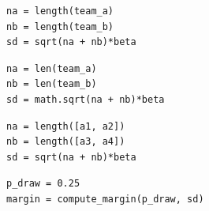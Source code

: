 \documentclass[a4paper,10pt]{book}
\theoremstyle{definition}
\newif\ifen
\newif\ifes
\newcommand{\en}[1]{\ifen#1\fi}
\newcommand{\es}[1]{\ifes#1\fi}
\begin{document}
\begin{lstlisting}[backgroundcolor=\color{white}, label=lst:draw, caption={\en{Computing the draw margin}\es{Computando el margen de empate}}, belowskip=-1.0 \baselineskip, aboveskip=-0 \baselineskip]
\end{lstlisting}
\begin{paracol}{3}
\begin{lstlisting}[backgroundcolor=\color{julia!60},belowskip=-0.77 \baselineskip]
na = length(team_a)
nb = length(team_b)
sd = sqrt(na + nb)*beta
\end{lstlisting}
\switchcolumn
\begin{lstlisting}[backgroundcolor=\color{python!60},belowskip=-0.77 \baselineskip]
na = len(team_a)
nb = len(team_b)
sd = math.sqrt(na + nb)*beta
\end{lstlisting}
\switchcolumn
\begin{lstlisting}[backgroundcolor=\color{r!50},belowskip=-0.77 \baselineskip]
na = length([a1, a2])
nb = length([a3, a4])
sd = sqrt(na + nb)*beta
\end{lstlisting}
\end{paracol}
\begin{lstlisting}[backgroundcolor=\color{all}]
p_draw = 0.25
margin = compute_margin(p_draw, sd)
\end{lstlisting}
%
\en{where the individual agents (\texttt{a1} to \texttt{a4}) were initialized in code~\ref{lst:player} and \texttt{beta} in code~\ref{lst:parameters}. }%
\es{donde los agentes \texttt{a} fueron inicializados en el c\'odigo \ref{lst:player}, y \texttt{beta} en el código~\ref{lst:parameters}. }%
\end{document}

